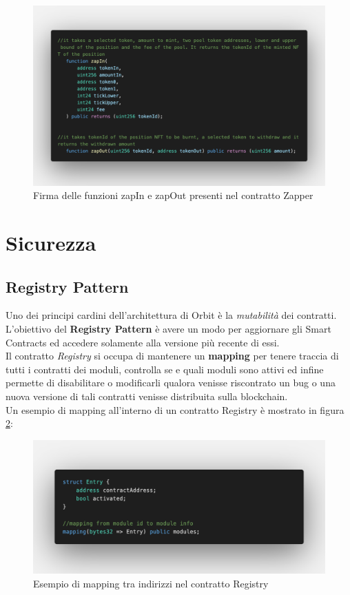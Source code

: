 \documentclass[12pt,a4paper]{report}
\begin{document}
\begin{figure}[H]
  \includegraphics[scale=0.26]{zapper.png}
  \centering
  \caption{Firma delle funzioni zapIn e zapOut presenti nel contratto Zapper}
  \label{fig:zapper}
\end{figure}


\section{Sicurezza}

\subsection{Registry Pattern} \label{registry}

Uno dei principi cardini dell'architettura di Orbit è la \textit{mutabilità} dei contratti.\\L'obiettivo del \textbf{Registry Pattern} è avere un modo per aggiornare gli Smart Contracts ed accedere solamente alla versione più recente di essi. 
\\Il contratto \textit{Registry} si occupa di mantenere un \textbf{mapping} per tenere traccia di tutti i contratti dei moduli, controlla se e quali moduli sono attivi ed infine permette di disabilitare o modificarli qualora venisse riscontrato un bug o una nuova versione di tali contratti venisse distribuita sulla blockchain.
\\Un esempio di mapping all'interno di un contratto Registry è mostrato in figura \ref{fig:registry}:

\begin{figure}[H]
  \includegraphics[scale=0.28]{registry.png}
  \centering
  \caption{Esempio di mapping tra indirizzi nel contratto Registry}
  \label{fig:registry}
\end{figure}
\end{document}
